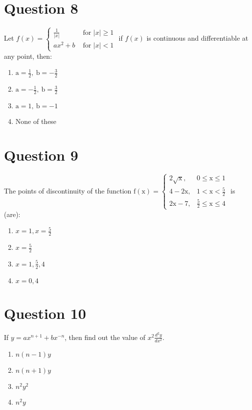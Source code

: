 \documentclass{article}
\begin{document}
\section*{Question 8}
Let \(f(x)=\left\{\begin{array}{ll}\frac{1}{|x|} & \text { for }|x| \geq 1 \\ a x^{2}+b & \text { for }|x|<1\end{array}\right.\) if \(f(x)\) is continuous and differentiable at any point, then:
\begin{enumerate}[label=(\alph*)]
\item \(\mathrm{a}=\frac{1}{2}, \mathrm{~b}=-\frac{3}{2}\)
\item \(\mathrm{a}=-\frac{1}{2}, \mathrm{~b}=\frac{3}{2}\)
\item \(\mathrm{a}=1, \mathrm{~b}=-1\)
\item None of these
\end{enumerate}
\newpage
\section*{Question 9}
The points of discontinuity of the function \(\mathrm{f}(\mathrm{x})=\left\{\begin{array}{ll}2 \sqrt{\mathrm{x}}, & 0 \leq \mathrm{x} \leq 1 \\ 4-2 \mathrm{x}, & 1<\mathrm{x}<\frac{5}{2} \\ 2 \mathrm{x}-7, & \frac{5}{2} \leq \mathrm{x} \leq 4\end{array}\right.\) is (are):
\begin{enumerate}[label=(\alph*)]
\item \({x}=1, {x}=\frac{5}{2}\)
\item \({x}=\frac{5}{2}\)
\item \({x}=1, \frac{5}{2}, 4\)
\item \({x}=0,4\)
\end{enumerate}
\newpage
\section*{Question 10}
If \(y=a x^{n+1}+b x^{-n}\), then find out the value of \(x^{2} \frac{d^{2} y}{d x^{2}}\).
\begin{enumerate}[label=(\alph*)]
\item \(n(n-1)y\)
\item \(n(n+1)y\)
\item \(n^{2} y^2\)
\item \(n^{2} y\)
\end{enumerate}
\newpage
\end{document}
